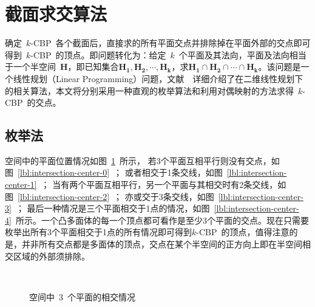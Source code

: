 \section{截面求交算法}
\label{sec:intersect-planes}

确定~$k$-CBP~各个截面后，直接求的所有平面交点并排除掉在平面外部的交点即可得到~$k$-CBP~的顶点。即问题转化为：给定~$k$~个平面及其法向，平面及法向相当于一个半空间~$\bm{H}$，即已知集合${\bm{H_1},
\bm{H_2}, \cdots, \bm{H_k}}$，求$\bm{H_1} \cap \bm{H_2} \cap \cdots
\cap \bm{H_k}$。该问题是一个线性规划（Linear
Programming）问题，文献~~详细介绍了在二维线性规划下的相关算法，本文将分别采用一种直观的枚举算法和利用对偶映射的方法求得~$k$-CBP~的交点。

\subsection{枚举法}
\label{subsec:intersection-enum-geometry}

空间中的平面位置情况如图~\ref{fig:three-planes-intersection}~所示，
若3个平面互相平行则没有交点，如图~\ref{lbl:intersection-center-0}~；
或者相交于1条交线，如图~\ref{lbl:intersection-center-1}~；
当有两个平面互相平行，另一个平面与其相交时有2条交线，如图~\ref{lbl:intersection-center-2}~；
亦或交于3条交线，如图~\ref{lbl:intersection-center-3}~；
最后一种情况是三个平面相交于1点的情况，如图~\ref{lbl:intersection-center-4}~所示。一个凸多面体的每一个顶点都可看作是至少3个平面的交点。现在只需要枚举出所有3个平面相交于1点的所有情况即可得到$k$-CBP~的顶点，值得注意的是，并非所有交点都是多面体的顶点，交点在某个半空间的正方向上即在半空间相交区域的外部须排除。

\begin{figure}[htbp]
  \centering
  \hspace{1em}%
  \hspace{1em}%
  \\
  \caption{空间中~3~个平面的相交情况}
  \label{fig:three-planes-intersection}
\end{figure}

